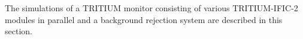 The simulations of a TRITIUM monitor consisting of various TRITIUM-IFIC-2 modules in parallel and a background rejection system are described in this section.